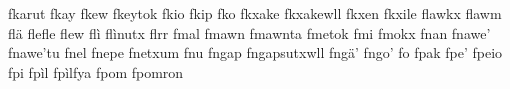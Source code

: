 fkarut\hspace{2mm}
fkay\hspace{2mm}
fkew\hspace{2mm}
fkeytok\hspace{2mm}
fkio\hspace{2mm}
fkip\hspace{2mm}
fko\hspace{2mm}
fkxake\hspace{2mm}
fkxakewll\hspace{2mm}
fkxen\hspace{2mm}
fkxile\hspace{2mm}
flawkx\hspace{2mm}
flawm\hspace{2mm}
flä\hspace{2mm}
flefle\hspace{2mm}
flew\hspace{2mm}
flì\hspace{2mm}
flìnutx\hspace{2mm}
flrr\hspace{2mm}
fmal\hspace{2mm}
fmawn\hspace{2mm}
fmawnta\hspace{2mm}
fmetok\hspace{2mm}
fmi\hspace{2mm}
fmokx\hspace{2mm}
fnan\hspace{2mm}
fnawe'\hspace{2mm}
fnawe'tu\hspace{2mm}
fnel\hspace{2mm}
fnepe\hspace{2mm}
fnetxum\hspace{2mm}
fnu\hspace{2mm}
fngap\hspace{2mm}
fngapsutxwll\hspace{2mm}
fngä'\hspace{2mm}
fngo'\hspace{2mm}
fo\hspace{2mm}
fpak\hspace{2mm}
fpe'\hspace{2mm}
fpeio\hspace{2mm}
fpi\hspace{2mm}
fpìl\hspace{2mm}
fpìlfya\hspace{2mm}
fpom\hspace{2mm}
fpomron\hspace{2mm}
